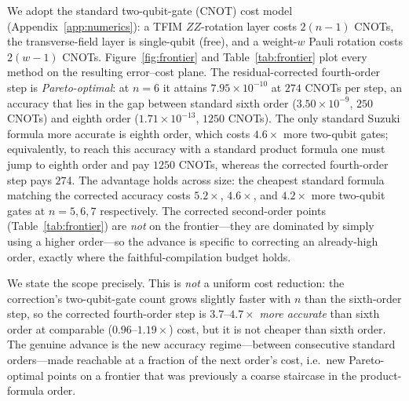 \documentclass[aps,prxquantum,reprint,superscriptaddress,nofootinbib,amsmath,amssymb]{revtex4-2}
\newcommand{\tfim}{TFIM}
\begin{document}


We adopt the standard two-qubit-gate (CNOT) cost model (Appendix~\ref{app:numerics}): a \tfim{} $ZZ$-rotation layer costs $2(n-1)$ CNOTs, the transverse-field layer is single-qubit (free), and a weight-$w$ Pauli rotation costs $2(w-1)$ CNOTs. Figure~\ref{fig:frontier} and Table~\ref{tab:frontier} plot every method on the resulting error--cost plane. The residual-corrected fourth-order step is \emph{Pareto-optimal}: at $n=6$ it attains $7.95\times10^{-10}$ at $274$ CNOTs per step, an accuracy that lies in the gap between standard sixth order ($3.50\times10^{-9}$, $250$ CNOTs) and eighth order ($1.71\times10^{-13}$, $1250$ CNOTs). The only standard Suzuki formula more accurate is eighth order, which costs $4.6\times$ more two-qubit gates; equivalently, to reach this accuracy with a standard product formula one must jump to eighth order and pay $1250$ CNOTs, whereas the corrected fourth-order step pays $274$. The advantage holds across size: the cheapest standard formula matching the corrected accuracy costs $5.2\times$, $4.6\times$, and $4.2\times$ more two-qubit gates at $n=5,6,7$ respectively. The corrected second-order points (Table~\ref{tab:frontier}) are \emph{not} on the frontier---they are dominated by simply using a higher order---so the advance is specific to correcting an already-high order, exactly where the faithful-compilation budget holds.

We state the scope precisely. This is \emph{not} a uniform cost reduction: the correction's two-qubit-gate count grows slightly faster with $n$ than the sixth-order step, so the corrected fourth-order step is $3.7$--$4.7\times$ \emph{more accurate} than sixth order at comparable ($0.96$--$1.19\times$) cost, but it is not cheaper than sixth order. The genuine advance is the new accuracy regime---between consecutive standard orders---made reachable at a fraction of the next order's cost, i.e.\ new Pareto-optimal points on a frontier that was previously a coarse staircase in the product-formula order.
\end{document}
